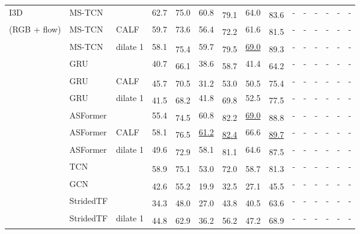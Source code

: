 \documentclass[runningheads]{llncs}
\newcommand{\best}[1]{\underline{#1}}
\newcommand{\nms}{\textsuperscript{\textdagger}}
\begin{document}
\begin{table*}[p]
{\begin{tabularx}{\textwidth}{lll
        rr
        rr
        rr
        rr
        rr
        rr
    }
        \midrule
        I3D~\cite{i3d}
        & MS-TCN &
            & 62.7 & 75.0 & 60.8 & \nms 79.1 & 64.0 & \nms 83.6 & - & - & - & - & - & - \\

        (RGB + flow)
        & MS-TCN & CALF
            & 59.7 & 73.6 & 56.4 & \nms 72.2 & 61.6 & \nms 81.5 & - & - & - & - & - & - \\

        & MS-TCN & dilate 1
            & 58.1 & \nms 75.4 & 59.7 & \nms 79.5 & \best{69.0} & \nms 89.3 & - & - & - & - & - & - \\

        \cmidrule{2-15}
        & GRU &
            & 40.7 & \nms 66.1 & 38.6 & \nms 58.7 & 41.4 & \nms 64.2 & - & - & - & - & - & - \\

        & GRU & CALF
            & \nms 45.7 & \nms 70.5 & \nms 31.2 & \nms 53.0 & \nms 50.5 & \nms 75.4 & - & - & - & - & - & - \\

        & GRU & dilate 1
            & \nms 41.5 & \nms 68.2 & 41.8 & \nms 69.8 & 52.5 & \nms 77.5 & - & - & - & - & - & - \\

        \cmidrule{2-15}
        & ASFormer &
            & 55.4 & \nms 74.5 & 60.8 & \nms 82.2 & \best{69.0} & \nms 88.8 & - & - & - & - & - & - \\
        & ASFormer & CALF
            & 58.1 & \nms 76.5 & \best{61.2} & \nms \best{82.4} & 66.6 & \nms \best{89.7} & - & - & - & - & - & - \\
        & ASFormer & dilate 1
            & 49.6 & \nms 72.9 & 58.1 & \nms 81.1 & 64.6 & \nms 87.5 & - & - & - & - & - & - \\

        \cmidrule{2-15}
        & TCN &
            & \nms 58.9 & \nms 75.1 & \nms 53.0 & \nms 72.0 & \nms 58.7 & \nms 81.3 & - & - & - & - & - & - \\

        & GCN &
            & \nms 42.6 & \nms 55.2 & \nms 19.9 & \nms 32.5 & \nms 27.1 & \nms 45.5 & - & - & - & - & - & - \\

        \cmidrule{2-15}
        & StridedTF &
            & \nms 34.3 & \nms 48.0 & \nms 27.0 & \nms 43.8 & \nms 40.5 & \nms 63.6 & - & - & - & - & - & - \\

        & StridedTF & dilate 1
            & \nms 44.8 & \nms 62.9 & \nms 36.2 & \nms 56.2 & \nms 47.2 & \nms 68.9 & - & - & - & - & - & - \\


\end{tabularx}}
\end{table*}
\end{document}
